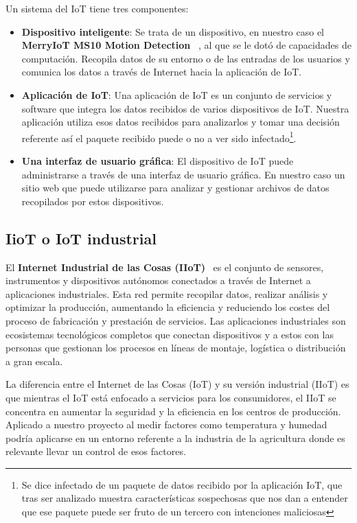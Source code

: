 Un sistema del IoT tiene tres componentes:
\begin{itemize}
   \item \textbf{Dispositivo inteligente}: Se trata de un dispositivo, en nuestro caso el \textbf{MerryIoT MS10 Motion Detection}~\cite{MerryIoT:manual} , al que se le dotó de capacidades de computación. Recopila datos de su entorno o de las entradas de los usuarios y comunica los datos a través de Internet hacia la aplicación de IoT.
    \item \textbf{Aplicación de IoT}: Una aplicación de IoT es un conjunto de servicios y software que integra los datos recibidos de varios dispositivos de IoT. Nuestra aplicación utiliza esos datos recibidos para analizarlos y tomar una decisión referente así el paquete recibido puede o no a ver sido infectado\footnote{Se dice infectado de un paquete de datos recibido por la aplicación IoT, que tras ser analizado muestra características sospechosas que nos dan a entender que ese paquete puede ser fruto de un tercero con intenciones maliciosas}.
    \item \textbf{Una interfaz de usuario gráfica}: El dispositivo de IoT puede administrarse a través de una interfaz de usuario gráfica. En nuestro caso un sitio web que puede utilizarse para analizar y gestionar archivos de datos recopilados por estos dispositivos.
\end{itemize}



\subsection{IioT o IoT industrial}
El \textbf{Internet Industrial de las Cosas (IIoT)}~\cite{ib:iiot} es el conjunto de sensores, instrumentos y dispositivos autónomos conectados a través de Internet a aplicaciones industriales. Esta red permite recopilar datos, realizar análisis y optimizar la producción, aumentando la eficiencia y reduciendo los costes del proceso de fabricación y prestación de servicios. Las aplicaciones industriales son ecosistemas tecnológicos completos que conectan dispositivos y a estos con las personas que gestionan los procesos en líneas de montaje, logística o distribución a gran escala.

La diferencia entre el Internet de las Cosas (IoT) y su versión industrial (IIoT) es que mientras el IoT está enfocado a servicios para los consumidores, el IIoT se concentra en aumentar la seguridad y la eficiencia en los centros de producción. Aplicado a nuestro proyecto al medir factores como temperatura y humedad podría aplicarse en un entorno referente a la industria de la agricultura donde es relevante llevar un control de esos factores.



